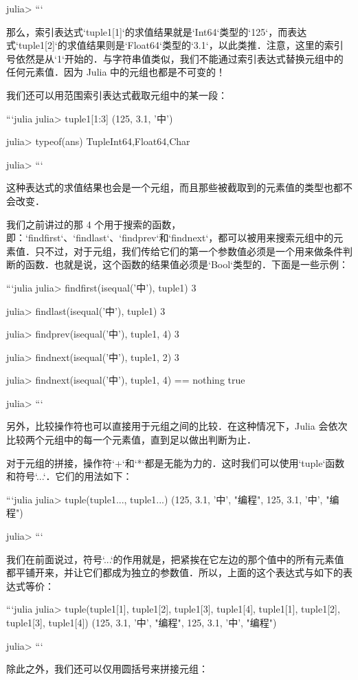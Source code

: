 julia> 
```

那么，索引表达式`tuple1[1]`的求值结果就是`Int64`类型的`125`，而表达式`tuple1[2]`的求值结果则是`Float64`类型的`3.1`，以此类推．注意，这里的索引号依然是从`1`开始的．与字符串值类似，我们不能通过索引表达式替换元组中的任何元素值．因为 Julia 中的元组也都是不可变的！

我们还可以用范围索引表达式截取元组中的某一段：

```julia
julia> tuple1[1:3]
(125, 3.1, '中')

julia> typeof(ans)
Tuple{Int64,Float64,Char}

julia> 
```

这种表达式的求值结果也会是一个元组，而且那些被截取到的元素值的类型也都不会改变．

我们之前讲过的那 4 个用于搜索的函数，即：`findfirst`、`findlast`、`findprev`和`findnext`，都可以被用来搜索元组中的元素值．只不过，对于元组，我们传给它们的第一个参数值必须是一个用来做条件判断的函数．也就是说，这个函数的结果值必须是`Bool`类型的．下面是一些示例：

```julia
julia> findfirst(isequal('中'), tuple1)
3

julia> findlast(isequal('中'), tuple1)
3

julia> findprev(isequal('中'), tuple1, 4)
3

julia> findnext(isequal('中'), tuple1, 2)
3

julia> findnext(isequal('中'), tuple1, 4) == nothing
true

julia>  
```

另外，比较操作符也可以直接用于元组之间的比较．在这种情况下，Julia 会依次比较两个元组中的每一个元素值，直到足以做出判断为止．

对于元组的拼接，操作符`+`和`*`都是无能为力的．这时我们可以使用`tuple`函数和符号`...`．它们的用法如下：

```julia
julia> tuple(tuple1..., tuple1...)
(125, 3.1, '中', "编程", 125, 3.1, '中', "编程")

julia> 
```

我们在前面说过，符号`...`的作用就是，把紧挨在它左边的那个值中的所有元素值都平铺开来，并让它们都成为独立的参数值．所以，上面的这个表达式与如下的表达式等价：

```julia
julia> tuple(tuple1[1], tuple1[2], tuple1[3], tuple1[4], tuple1[1], tuple1[2], tuple1[3], tuple1[4])
(125, 3.1, '中', "编程", 125, 3.1, '中', "编程")

julia> 
```

除此之外，我们还可以仅用圆括号来拼接元组：

